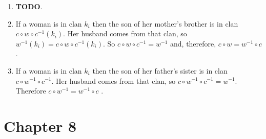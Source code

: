 \documentclass{article}
\begin{document}
\begin{enumerate}
    \item \textbf{TODO}.

    \item If a woman is in clan $k_i$ then the son of her mother's brother is in clan $c \circ w \circ c^{-1}(k_i)$. Her husband comes from that clan, so $w^{-1}(k_i) = c \circ w \circ c^{-1}(k_i)$. So $c \circ w \circ c^{-1} = w^{-1}$ and, therefore, $c \circ w = w^{-1} \circ c$.

    \item If a woman is in clan $k_i$ then the son of her father's sister is in clan $c \circ w^{-1} \circ c^{-1}$. Her husband comes from that clan, so $c \circ w^{-1} \circ c^{-1} = w^{-1}$. Therefore $c \circ w^{-1} = w^{-1} \circ c$ .
\end{enumerate}

\section{Chapter 8}
\end{document}
